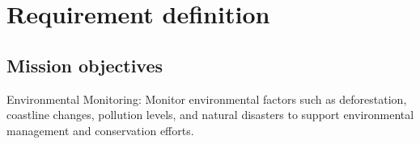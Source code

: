 \documentclass[]{article}
\title{}
\author{}
\begin{document}
\maketitle

\begin{abstract}

\end{abstract}

\section{Requirement definition}
\subsection{Mission objectives}
Environmental Monitoring: Monitor environmental factors such as deforestation, coastline changes, pollution levels, and natural disasters to support environmental management and conservation efforts.
\end{document}
